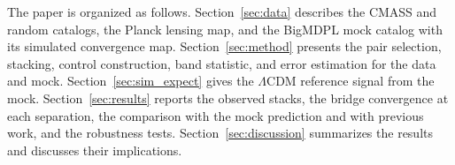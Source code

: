 \documentclass[preprint]{aastex701}
\newcommand{\hinvMpc}{h^{-1}{\rm Mpc}}
\begin{document}
The paper is organized as follows. Section~\ref{sec:data} describes the
CMASS and random catalogs, the Planck lensing map, and the BigMDPL mock
catalog with its simulated convergence map. Section~\ref{sec:method}
presents the pair selection, stacking, control construction, band statistic,
and error estimation for the data and mock.
Section~\ref{sec:sim_expect} gives the $\Lambda$CDM reference signal from the
mock. Section~\ref{sec:results} reports the observed stacks, the bridge
convergence at each separation, the comparison with the mock prediction and
with previous work, and the robustness tests. Section~\ref{sec:discussion}
summarizes the results and discusses their implications.

\end{document}
